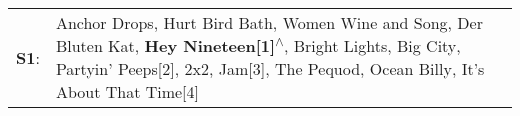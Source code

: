 \begin{supertabular}{p{0.03\textwidth}p{0.92\textwidth}}
 \textbf{S1}:  &  Anchor Drops\textsuperscript{}, \enspace Hurt Bird Bath\textsuperscript{}, \enspace Women Wine and Song\textsuperscript{}, \enspace Der Bluten Kat\textsuperscript{}, \enspace \textbf{Hey Nineteen[1]\textsuperscript{$\wedge$}}, \enspace Bright Lights, Big City\textsuperscript{}, \enspace Partyin' Peeps[2]\textsuperscript{}, \enspace 2x2\textsuperscript{}, \enspace Jam[3]\textsuperscript{}, \enspace The Pequod\textsuperscript{}, \enspace Ocean Billy\textsuperscript{}, \enspace It's About That Time[4]\textsuperscript{}  \enspace  \\
\end{supertabular}

